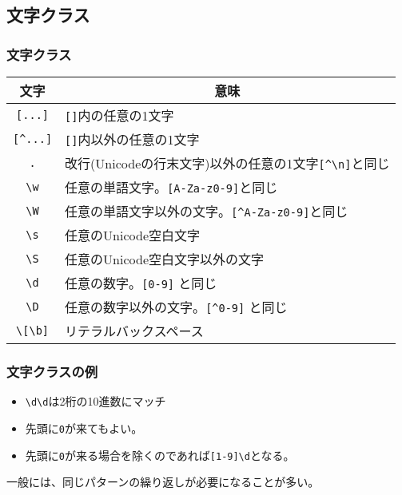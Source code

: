 \subsection{文字クラス}
\begin{frame}[containsverbatim]
 \frametitle{文字クラス}
\begin{center}
 \begin{tabular}{|c|m{}|}\hline
  文字&\multicolumn{1}{c|}{意味}\\\hline
  \texttt{[...]}&\texttt{[]}内の任意の1文字\\\hline
  \Verb+[^...]+& \texttt{[]}内以外の任意の1文字\\ \hline
  \Verb+.+& 改行(Unicodeの行末文字)以外の任意の1文字\Verb+[^\n]+と同じ\\ \hline
  \Verb+\w+& 任意の単語文字。\Verb+[A-Za-z0-9]+と同じ\\ \hline
  \Verb+\W+& 任意の単語文字以外の文字。\Verb+[^A-Za-z0-9]+と同じ\\ \hline
  \Verb+\s+& 任意のUnicode空白文字\\ \hline
  \Verb+\S+& 任意のUnicode空白文字以外の文字\\ \hline
  \Verb+\d+& 任意の数字。\Verb+[0-9]+ と同じ\\ \hline
  \Verb+\D+&任意の数字以外の文字。\Verb+[^0-9]+ と同じ\\\hline
  \Verb+\[\b]+& リテラルバックスペース\\ \hline
 \end{tabular}
\end{center}
\end{frame}
\begin{frame}[containsverbatim]
 \frametitle{文字クラスの例}
\begin{itemize}
 \item \Verb+\d\d+は2桁の10進数にマッチ
 \item 先頭に\Verb+0+が来てもよい。
 \item 先頭に\Verb+0+が来る場合を除くのであれば\Verb+[1-9]\d+となる。
\end{itemize}
一般には、同じパターンの繰り返しが必要になることが多い。
\end{frame}

